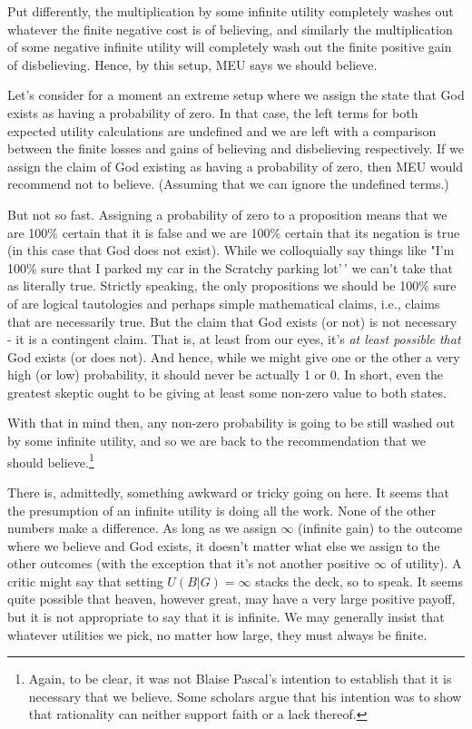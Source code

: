 \documentclass[]{tufte-book}
\begin{document}
Put differently, the multiplication by some infinite utility completely washes out whatever the finite negative cost is of believing, and similarly the multiplication of some negative infinite utility will completely wash out the finite positive gain of disbelieving. Hence, by this setup, MEU says we should believe.

Let's consider for a moment an extreme setup where we assign the state that God exists as having a probability of zero. In that case, the left terms for both expected utility calculations are undefined and we are left with a comparison between the finite losses and gains of believing and disbelieving respectively. If we assign the claim of God existing as having a probability of zero, then MEU would recommend not to believe. (Assuming that we can ignore the undefined terms.)

But not so fast. Assigning a probability of zero to a proposition means that we are 100\% certain that it is false and we are 100\% certain that its negation is true (in this case that God does not exist). While we colloquially say things like "I'm 100\% sure that I parked my car in the Scratchy parking lot'\,' we can't take that as literally true. Strictly speaking, the only propositions we should be 100\% sure of are logical tautologies and perhaps simple mathematical claims, i.e., claims that are necessarily true. But the claim that God exists (or not) is not necessary - it is a contingent claim. That is, at least from our eyes, it's \emph{at least possible that} God exists (or does not). And hence, while we might give one or the other a very high (or low) probability, it should never be actually 1 or 0. In short, even the greatest skeptic ought to be giving at least some non-zero value to both states.

With that in mind then, any non-zero probability is going to be still washed out by some infinite utility, and so we are back to the recommendation that we should believe.\footnote{Again, to be clear, it was not Blaise Pascal's intention to establish that it is necessary that we believe. Some scholars argue that his intention was to show that rationality can neither support faith or a lack thereof.}

There is, admittedly, something awkward or tricky going on here. It seems that the presumption of an infinite utility is doing all the work. None of the other numbers make a difference. As long as we assign \(\infty\) (infinite gain) to the outcome where we believe and God exists, it doesn't matter what else we assign to the other outcomes (with the exception that it's not another positive \(\infty\) of utility). A critic might say that setting \(U(B|G)= \infty\) stacks the deck, so to speak. It seems quite possible that heaven, however great, may have a very large positive payoff, but it is not appropriate to say that it is infinite. We may generally insist that whatever utilities we pick, no matter how large, they must always be finite.
\end{document}

